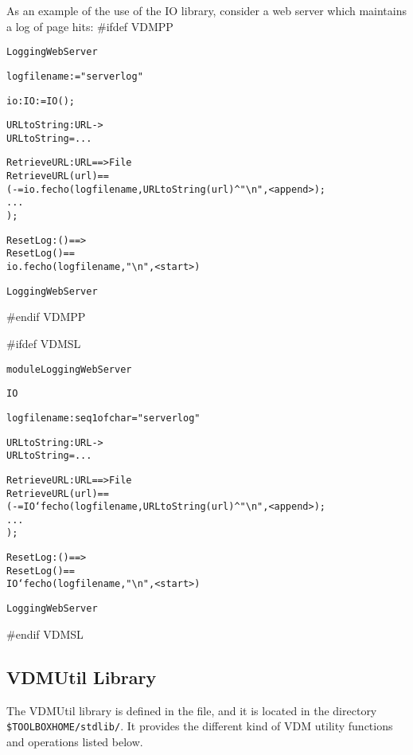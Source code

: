 \documentclass[\pformat,12pt]{article}
\begin{document}
As an example of the use of the IO library, consider a
web server which maintains a log of page hits:
#ifdef VDMPP
\begin{alltt}
   LoggingWebServer

      logfilename :  = "serverlog"

      io : IO :=  IO();

      URLtoString : URL -> 
      URLtoString = ...

      RetrieveURL : URL ==> File
      RetrieveURL(url) ==
        ( - = io.fecho(logfilename, URLtoString(url)^\verb+"\n"+, <append>);
         ... 
        );

      ResetLog : () ==> 
      ResetLog() ==
        io.fecho(logfilename,\verb+"\n"+,<start>)

   LoggingWebServer
\end{alltt}
#endif VDMPP

#ifdef VDMSL
\begin{alltt}
  module LoggingWebServer

       IO 

     


      logfilename : seq1 of char = "serverlog"

      URLtoString : URL ->   
      URLtoString = ...

      RetrieveURL : URL ==> File
      RetrieveURL(url) ==
        ( - = IO`fecho(logfilename, URLtoString(url)^\verb+"\n"+, <append>);
         ... 
        );

      ResetLog : () ==> 
      ResetLog() ==
        IO`fecho(logfilename,\verb+"\n"+,<start>)

   LoggingWebServer
\end{alltt}
#endif VDMSL

\subsection{VDMUtil Library}

The VDMUtil library is defined in the 
 file, and it 
is located 
in the directory \verb+$TOOLBOXHOME/stdlib/+.  
It provides the different kind of VDM utility functions and 
operations listed below. 
\end{document}
